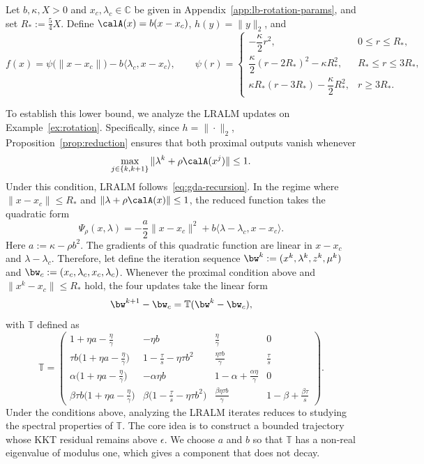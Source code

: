 \begin{example}
\label{ex:rotation}
Let \(b,\kappa,X>0\) and \(x_c,\lambda_c\in\mathbb C\) be given in
Appendix~\ref{app:lb-rotation-params}, and set \(R_*:=\frac54X\). Define
\(\calA(x)=b(x-x_c)\), \(h(y)=\|y\|_2\), and
\[
f(x)=\psi\bigl(\|x-x_c\|\bigr)-b\langle\lambda_c,x-x_c\rangle,
\qquad
\psi(r)=
\begin{cases}
-\dfrac{\kappa}{2}r^2, & 0\le r\le R_*,\\[4pt]
\dfrac{\kappa}{2}(r-2R_*)^2-\kappa R_*^2, & R_*\le r\le3R_*,\\[4pt]
\kappa R_*(r-3R_*)-\dfrac{\kappa}{2}R_*^2, & r\ge3R_*.
\end{cases}
\]
\end{example}
To establish this lower bound, we analyze the LRALM updates on
Example~\ref{ex:rotation}. Specifically, since \(h=\|\cdot\|_2\), Proposition~\ref{prop:reduction} ensures that both proximal outputs vanish
whenever
\[
\max_{j\in\{k,k+1\}}\|\lambda^k+\rho\calA(x^j)\|\le1.
\] 
Under this condition, LRALM follows~\eqref{eq:gda-recursion}. In the regime where \(\|x-x_c\|\le R_*\) and \(\|\lambda+\rho\calA(x)\|\le1\),
the reduced function takes the quadratic form
\[
\Psi_\rho(x,\lambda)
=-\frac{a}{2}\|x-x_c\|^2+b\langle\lambda-\lambda_c,x-x_c\rangle .
\]
Here \(a:=\kappa-\rho b^2\). The gradients of this quadratic function are
linear in \(x-x_c\) and \(\lambda-\lambda_c\). 
Therefore, let define the iteration sequence \(\bw^k:=(x^k,\lambda^k,z^k,\mu^k)\) and
\(\bw_c:=(x_c,\lambda_c,x_c,\lambda_c)\). Whenever the proximal condition
above and \(\|x^k-x_c\|\le R_*\) hold, the four updates take the linear form
\[
\bw^{k+1}-\bw_c=\mathbb T(\bw^k-\bw_c),
\] with $\mathbb T$ defined as 
\begin{equation}
\label{eq:rot-matrix}
\mathbb T=\begin{pmatrix}
1+\eta a-\tfrac{\eta}{\gamma} & -\eta b & \tfrac{\eta}{\gamma} & 0\\[2pt]
\tau b\bigl(1+\eta a-\tfrac{\eta}{\gamma}\bigr) & 1-\tfrac{\tau}{s}-\eta\tau b^2
  & \tfrac{\eta\tau b}{\gamma} & \tfrac{\tau}{s}\\[2pt]
\alpha\bigl(1+\eta a-\tfrac{\eta}{\gamma}\bigr) & -\alpha\eta b
  & 1-\alpha+\tfrac{\alpha\eta}{\gamma} & 0\\[2pt]
\beta\tau b\bigl(1+\eta a-\tfrac{\eta}{\gamma}\bigr)
  & \beta\bigl(1-\tfrac{\tau}{s}-\eta\tau b^2\bigr)
  & \tfrac{\beta\eta\tau b}{\gamma} & 1-\beta+\tfrac{\beta\tau}{s}
\end{pmatrix}.
\end{equation}
Under the conditions above, analyzing the LRALM iterates reduces to
studying the spectral properties of \(\mathbb T\).
The core idea is to construct a bounded trajectory whose KKT residual remains
above \(\epsilon\). We choose \(a\) and \(b\) so that \(\mathbb T\) has a
non-real eigenvalue of modulus one, which gives a component that does not
decay.

